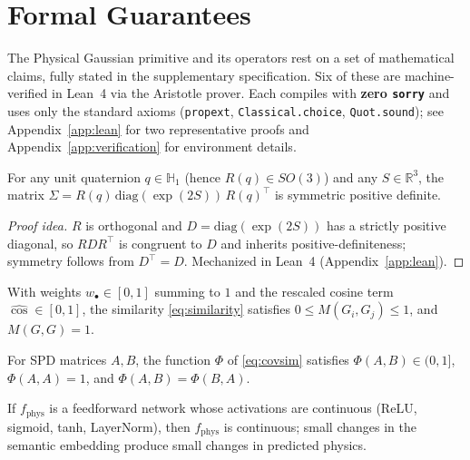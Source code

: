 \documentclass[twoside,11pt]{article}
\begin{document}
\section{Formal Guarantees}
\label{sec:guarantees}

The Physical Gaussian primitive and its operators rest on a set of mathematical claims, fully stated in the supplementary specification. Six of these are machine-verified in Lean~4 via the Aristotle prover. Each compiles with \textbf{zero \texttt{sorry}} and uses only the standard axioms (\texttt{propext}, \texttt{Classical.choice}, \texttt{Quot.sound}); see Appendix~\ref{app:lean} for two representative proofs and Appendix~\ref{app:verification} for environment details.

\begin{theorem}
\label{thm:p1}
For any unit quaternion $q \in \mathbb{H}_1$ (hence $R(q) \in SO(3)$) and any $S \in \mathbb{R}^3$, the matrix $\Sigma = R(q)\,\mathrm{diag}(\exp(2S))\,R(q)^{\top}$ is symmetric positive definite.
\end{theorem}
\begin{proof}[Proof idea]
$R$ is orthogonal and $D = \mathrm{diag}(\exp(2S))$ has a strictly positive diagonal, so $RDR^{\top}$ is congruent to $D$ and inherits positive-definiteness; symmetry follows from $D^{\top} = D$. Mechanized in Lean~4 (Appendix~\ref{app:lean}).
\end{proof}

\begin{theorem}
\label{thm:p2}
With weights $w_\bullet \in [0,1]$ summing to $1$ and the rescaled cosine term $\widehat{\cos} \in [0,1]$, the similarity \eqref{eq:similarity} satisfies $0 \le M(G_i, G_j) \le 1$, and $M(G, G) = 1$.
\end{theorem}

\begin{theorem}
\label{thm:p4}
For SPD matrices $A, B$, the function $\Phi$ of \eqref{eq:covsim} satisfies $\Phi(A,B) \in (0,1]$, $\Phi(A,A) = 1$, and $\Phi(A,B) = \Phi(B,A)$.
\end{theorem}

\begin{theorem}
\label{thm:p5}
If $f_{\text{phys}}$ is a feedforward network whose activations are continuous (ReLU, sigmoid, tanh, LayerNorm), then $f_{\text{phys}}$ is continuous; small changes in the semantic embedding produce small changes in predicted physics.
\end{theorem}
\end{document}
